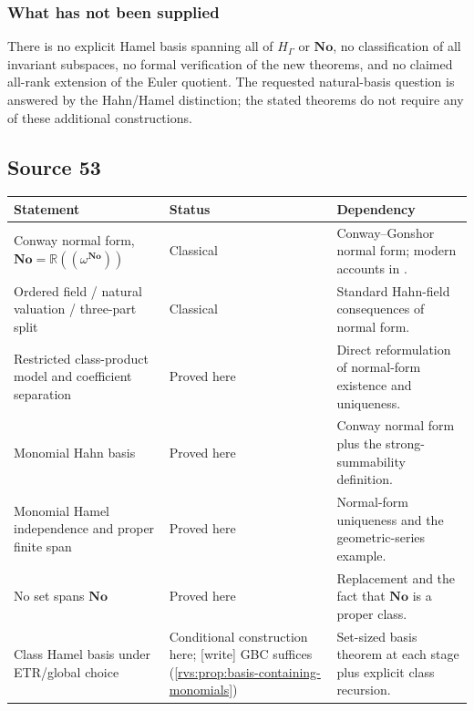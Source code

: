 \documentclass[11pt,letterpaper]{article}
\numberwithin{equation}{section}
\theoremstyle{definition}
\theoremstyle{remark}
\newcommand{\No}{\mathbf{No}}
\newcommand{\R}{\mathbb{R}}
\newcommand{\wtag}{\textup{[write]}}%
\begin{document}
\subsubsection{What has not been supplied}
There is no explicit Hamel basis spanning all of $H_\Gamma$ or $\No$, no classification of all invariant subspaces, no formal verification of the new theorems, and no claimed all-rank extension of the Euler quotient. The requested natural-basis question is answered by the Hahn/Hamel distinction; the stated theorems do not require any of these additional constructions.

\subsection{Source 53}

\begin{longtable}{>{\raggedright\arraybackslash}p{}
                  >{\raggedright\arraybackslash}p{}
                  >{\raggedright\arraybackslash}p{}}
\toprule
\textbf{Statement} & \textbf{Status} & \textbf{Dependency}\\
\midrule
\endhead
Conway normal form, $\No=\R((\omega^{\No}))$ & Classical
& Conway--Gonshor normal form; modern accounts in
\cite{Gonshor,Ehrlich2011,MantovaMatusinski,CostinEhrlich}.\\[0.3em]

Ordered field / natural valuation / three-part split & Classical
& Standard Hahn-field consequences of normal form.\\[0.3em]

Restricted class-product model and coefficient separation & Proved here
& Direct reformulation of normal-form existence and uniqueness.\\[0.3em]

Monomial Hahn basis & Proved here
& Conway normal form plus the strong-summability definition.\\[0.3em]

Monomial Hamel independence and proper finite span & Proved here
& Normal-form uniqueness and the geometric-series example.\\[0.3em]

No set spans $\No$ & Proved here
& Replacement and the fact that $\No$ is a proper class.\\[0.3em]

Class Hamel basis under ETR/global choice & Conditional construction here; \wtag{} GBC suffices (\cref{rvs:prop:basis-containing-monomials})
& Set-sized basis theorem at each stage plus explicit class recursion.\\[0.3em]


\end{longtable}
\end{document}
